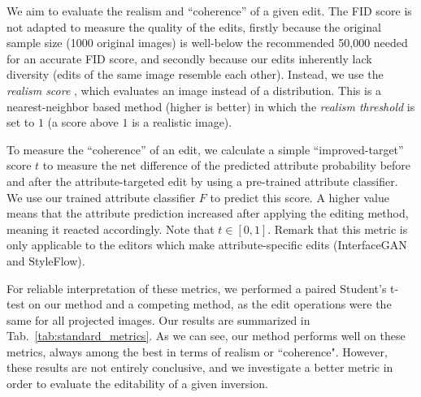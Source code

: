 We aim to evaluate the realism and ``coherence'' of a given edit. The \ac{FID} score 
\citep{fidscore} is not adapted to measure the quality of the edits, firstly because the 
original sample size (1000 original images) is well-below the recommended 50,000 needed 
for an accurate \ac{FID} score, and secondly because our edits inherently lack diversity 
(edits of the same image resemble each other).
Instead, we use the \emph{realism score} \citep{precision_recall}, which evaluates an 
image instead of a distribution. This is a nearest-neighbor based method 
(higher is better) in which the \emph{realism threshold} is set to $1$ (a score above 
$1$ is a realistic image). 

To measure the ``coherence'' of an edit, we calculate a simple ``improved-target'' score
 $t$ to measure the net difference of the predicted attribute probability before and 
 after the attribute-targeted edit by using a pre-trained attribute classifier. We use 
 our trained attribute classifier $F$ to predict this score. A higher
  value means that the attribute prediction increased after applying the editing method,
   meaning it reacted accordingly. Note that $t \in [0, 1]$. Remark that this metric is 
   only applicable to the editors which make attribute-specific edits (InterfaceGAN 
   and StyleFlow).

For reliable interpretation of these metrics, we performed a paired Student's t-test on 
our method and a competing method, as the edit operations were the same for all projected
 images. Our results are summarized in Tab.~\ref{tab:standard_metrics}. As we can see, 
 our method performs well on these metrics, always among the best in terms of realism or 
 ``coherence". However, these results are not entirely conclusive, and we investigate a 
 better metric in order to evaluate the editability of a given inversion.

